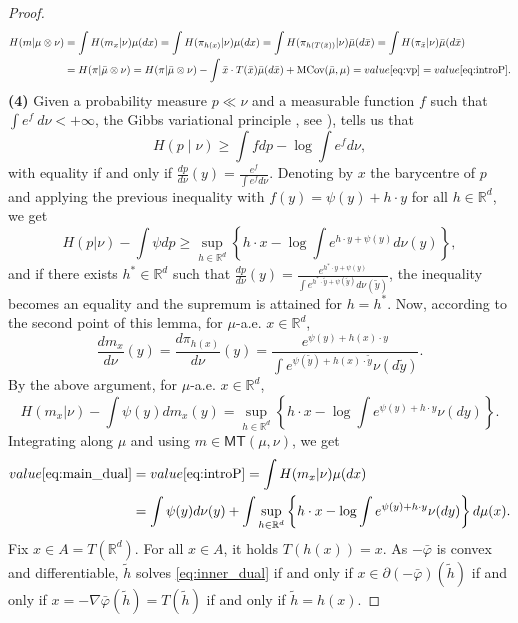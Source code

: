 \documentclass[reqno, a4paper]{amsart}
\theoremstyle{plain}
\theoremstyle{definition}
\theoremstyle{remark}
\numberwithin{equation}{section}
\numberwithin{theorem}{section}
\newcommand{\R}{\mathbb{R}}
\newcommand{\MT}{\mathsf{MT}}
\newcommand{\MCov}{\textnormal{MCov}}
\begin{document}
\begin{proof}
		\begin{align*}
			H(m|\mu \otimes \nu) &= \int H(m_x|\nu) \mu(dx) = \int H(\pi_{h(x)}|\nu) \mu(dx)
			= \int H(\pi_{h(T(\bar x))}|\nu) \bar \mu(d \bar x) 
			= \int H(\pi_{\bar x}|\nu) \bar \mu(d \bar x)\\ &= H(\pi|\bar \mu \otimes \nu)
			= H(\pi|\bar \mu \otimes \nu) - \int \bar x \cdot T(\bar x) \bar \mu( d \bar x) + \MCov (\bar \mu,\mu) = value\eqref{eq:vp} = value\eqref{eq:introP}.
		\end{align*}
		\newline
		\textbf{(4)} Given a probability measure $p \ll \nu $ and a measurable function $f$ such that $\int e^f ~d\nu < + \infty$, the Gibbs variational principle , see \cite[Appendix A, (A.5)]{Le14}),  tells us that 
		$$ H(p\mid \nu) \geq \int f dp - \log  \int e^f d\nu,$$
		with equality if and only if $\frac{dp}{d\nu}(y) = \frac{e^f}{\int e^f d\nu}$. Denoting by $x$ the barycentre of $p$ and applying the previous inequality with $f(y) = \psi(y) + h\cdot y$ for all $h \in \R^d$, we get $$H(p|\nu) - \int \psi dp \geq \sup_{h \in \R^d} \left\{h\cdot x - \log \int e^{h\cdot y + \psi(y)} d\nu(y) \right\},$$ and if there exists $h^* \in \R^d$ such that $\frac{dp}{d\nu}(y) = \frac{e^{h^*\cdot y + \psi(y)}}{\int e^{h^*\cdot \tilde{y}+ \psi(\tilde{y})} d\nu(\tilde{y})}$, the inequality becomes an equality and the supremum is attained for $h=h^*$. Now, according to the second point of this lemma, for $\mu$-a.e. $x \in \R^d$, $$\frac{d m_x}{d\nu}(y) = \frac{d \pi_{h(x)}}{d\nu}(y) = \frac{e^{\psi(y) + h(x)\cdot y}}{\int e^{\psi( \tilde y) + h(x) \cdot \tilde y  } \nu(d \tilde{y})}.$$  By the above argument, for $\mu$-a.e. $x \in \R^d$,	$$H(m_x|\nu) - \int \psi(y) dm_x(y) = \sup_{h \in \R^d} \left\{ h \cdot x - \log\int e^{\psi(y)+h \cdot y} \nu(dy)\right\}.$$ Integrating along $\mu$ and using $m \in \MT(\mu,\nu)$, we get
		\begin{align*}
			value\eqref{eq:main_dual} &= value\eqref{eq:introP} = \int H(m_x|\nu) \mu(dx)\\ &= \int \psi(y) d\nu(y) + \int \sup_{h \in \R^d} \left\{ h \cdot x - \log\int e^{\psi(y)+h \cdot y} \nu(dy)\right\}d \mu(x).
		\end{align*}
		Fix $x \in A = T(\R^d)$. For all $x \in A$, it holds $T(h(x)) = x$. As  $-\bar\varphi$ is convex and differentiable, $\tilde h$ solves \eqref{eq:inner_dual} if and only if $x \in \partial (-\bar\varphi)(\tilde h) $ if and only if $x = -\nabla \bar\varphi(\tilde h) = T(\tilde h) $ if and only if  $\tilde h = h(x)$. 
	\end{proof}
	
\end{document}
